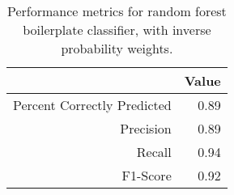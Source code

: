 \begin{table}[ht]
\centering
\begin{tabular}{rr}
  \hline
 & Value \\ 
  \hline
Percent Correctly Predicted & 0.89 \\ 
  Precision & 0.89 \\ 
  Recall & 0.94 \\ 
  F1-Score & 0.92 \\ 
   \hline
\end{tabular}
\caption{Performance metrics for random forest boilerplate classifier, with inverse probability weights.} 
\label{randomForest}
\end{table}

